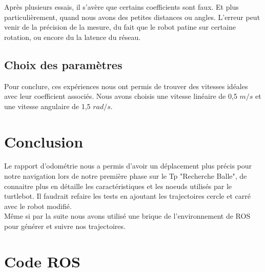 \documentclass[10pt,a4paper]{article}
\begin{document}

Après plusieurs essais, il s'avère que certains coefficients sont faux. Et plus particulièrement, quand nous avons des petites distances ou angles. L'erreur peut venir de la précision de la mesure, du fait que le robot patine sur certaine rotation, ou encore du la latence du réseau.\\

\subsection{Choix des paramètres}
Pour conclure, ces expériences nous ont permis de trouver des vitesses idéales avec leur coefficient associés.
Nous avons choisis une vitesse linéaire de 0,5 $m/s$ et une vitesse angulaire de 1,5 $rad/s$.


\section{Conclusion}

Le rapport d'odométrie nous a permis d'avoir un déplacement plus précis pour notre navigation lors de notre première phase sur le Tp "Recherche Balle", de connaitre plus en détaille les caractéristiques et les noeuds utilisés par le turtlebot. Il faudrait refaire les tests en ajoutant les trajectoires cercle et  carré avec le robot modifié.\\
Même si par la suite nous avons utilisé une brique de l'environnement de ROS pour générer et suivre nos trajectoires. \\

\section{Code ROS}
\end{document}
